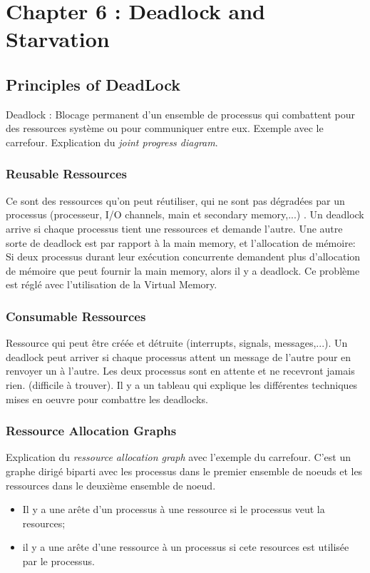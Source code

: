 \section{Chapter 6 : Deadlock and Starvation}

\subsection{Principles of DeadLock}
Deadlock : Blocage permanent d'un ensemble de processus qui combattent pour des ressources système ou pour communiquer entre eux.
Exemple avec le carrefour.
Explication du \emph{joint progress diagram}.

\subsubsection{Reusable Ressources}
Ce sont des ressources qu'on peut réutiliser, qui ne sont pas dégradées par un processus (processeur, I/O channels, main et secondary memory,...) .
Un deadlock arrive si chaque processus tient une ressources et demande l'autre.
Une autre sorte de deadlock est par rapport à la main memory, et l'allocation de mémoire: Si deux processus durant leur exécution concurrente demandent plus d'allocation de mémoire que peut fournir la main memory, alors il y a deadlock.
Ce problème est réglé avec l'utilisation de la Virtual Memory.

\subsubsection{Consumable Ressources}
Ressource qui peut être créée et détruite (interrupts, signals, messages,...).
Un deadlock peut arriver si chaque processus attent un message de l'autre pour en renvoyer un à l'autre.
Les deux processus sont en attente et ne recevront jamais rien.
(difficile à trouver).
Il y a un tableau \cite[p.~285]{stallings} qui explique les différentes techniques mises en oeuvre pour combattre les deadlocks.

\subsubsection{Ressource Allocation Graphs}
Explication du \emph{ressource allocation graph} avec l'exemple du carrefour.
C'est un graphe dirigé biparti avec les processus dans le premier ensemble de noeuds
et les ressources dans le deuxième ensemble de noeud.
\begin{itemize}
  \item Il y a une arête d'un processus à une ressource si le processus veut la resources;
  \item il y a une arête d'une ressource à un processus si cete resources est utilisée par le processus.
\end{itemize}


